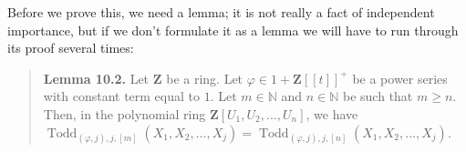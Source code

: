 \documentclass[numbers=enddot,12pt,final,onecolumn,notitlepage]{scrartcl}%
\begin{document}
Before we prove this, we need a lemma; it is not really a fact of independent
importance, but if we don't formulate it as a lemma we will have to run
through its proof several times:

\begin{quote}
\textbf{Lemma 10.2.} Let $\mathbf{Z}$ be a ring. Let $\varphi\in
1+\mathbf{Z}\left[  \left[  t\right]  \right]  ^{+}$ be a power series with
constant term equal to $1$. Let $m\in\mathbb{N}$ and $n\in\mathbb{N}$ be such
that $m\geq n$. Then, in the polynomial ring $\mathbf{Z}\left[  U_{1}%
,U_{2},...,U_{n}\right]  $, we have $\operatorname*{Todd}\nolimits_{\left(
\varphi,j\right)  ,j,\left[  m\right]  }\left(  X_{1},X_{2},...,X_{j}\right)
=\operatorname*{Todd}\nolimits_{\left(  \varphi,j\right)  ,j,\left[  n\right]
}\left(  X_{1},X_{2},...,X_{j}\right)  $.
\end{quote}
\end{document}
